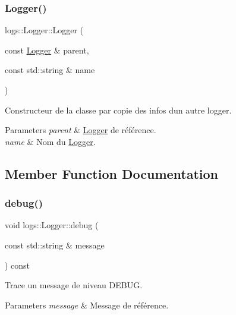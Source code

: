 \subsubsection{\texorpdfstring{Logger()}{Logger()}\hspace{0.1cm}{\footnotesize\ttfamily [2/2]}}
{\footnotesize\ttfamily logs\+::\+Logger\+::\+Logger (\begin{DoxyParamCaption}\item[{const \hyperlink{classlogs_1_1Logger}{Logger} \&}]{parent,  }\item[{const std\+::string \&}]{name }\end{DoxyParamCaption})}



Constructeur de la classe par copie des infos d\textquotesingle{}un autre logger. 


\begin{DoxyParams}{Parameters}
{\em parent} & \hyperlink{classlogs_1_1Logger}{Logger} de référence. \\
\hline
{\em name} & Nom du \hyperlink{classlogs_1_1Logger}{Logger}. \\
\hline
\end{DoxyParams}


\subsection{Member Function Documentation}
\mbox{\label{classlogs_1_1Logger_a7dffc8f610014ec59b63392da16140e4}} 
\subsubsection{\texorpdfstring{debug()}{debug()}\hspace{0.1cm}{\footnotesize\ttfamily [1/2]}}
{\footnotesize\ttfamily void logs\+::\+Logger\+::debug (\begin{DoxyParamCaption}\item[{const std\+::string \&}]{message }\end{DoxyParamCaption}) const\hspace{0.3cm}{\ttfamily [inline]}}



Trace un message de niveau D\+E\+B\+UG. 


\begin{DoxyParams}{Parameters}
{\em message} & Message de référence. \\
\hline
\end{DoxyParams}
\mbox{\label{classlogs_1_1Logger_aade259b85b4978c3b69fcdcc12a5974a}} 
